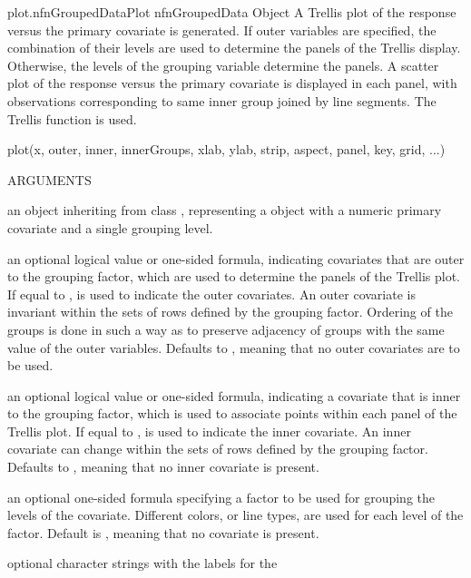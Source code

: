 \documentclass[pdftex]{article} \usepackage{url,graphicx}
\begin{document}
\begin{Helpfile}{plot.nfnGroupedData}{Plot nfnGroupedData Object}
A Trellis plot of the response versus the primary covariate is
generated. If outer variables are specified, the combination of their
levels are used to determine the panels of the Trellis
display. Otherwise, the levels of the grouping variable determine the
panels. A scatter plot of the response versus the primary covariate is
displayed in each panel, with observations corresponding to same
inner group joined by line segments. The Trellis function
 is used.
\begin{Example}
plot(x, outer, inner, innerGroups, xlab, ylab, strip, aspect, 
     panel, key, grid, ...)
\end{Example}
\begin{Argument}{ARGUMENTS}
\item[\Co{x:}]
an object inheriting from class ,
representing a  object with a numeric primary
covariate and a single grouping level.
\item[\Co{outer:}]
an optional logical value or one-sided formula,
indicating covariates that are outer to the grouping factor, which
are used to determine the panels of the Trellis plot. If
equal to ,  is used to
indicate the outer covariates. An outer covariate is invariant within
the sets of rows defined by the grouping factor.  Ordering of the
groups is done in such a way as to preserve adjacency of groups with
the same value of the outer variables. Defaults to ,
meaning that no outer covariates are to be used.
\item[\Co{inner:}]
an optional logical value or one-sided formula, indicating
a covariate that is inner to the grouping factor, which is used to
associate points within each panel of the Trellis plot. If
equal to ,  is used to
indicate the inner covariate. An inner covariate can change within
the sets of rows defined by the grouping  factor. Defaults to
, meaning that no inner covariate  is present. 
\item[\Co{innerGroups:}]
an optional one-sided formula specifying a factor
to be used for grouping the levels of the 
covariate. Different colors, or line types, are used for each level
of the  factor. Default is , meaning
that no  covariate is present.
\item[\Co{xlab, ylab:}]
optional character strings with the labels for the

\end{Argument}
\end{Helpfile}
\end{document}
